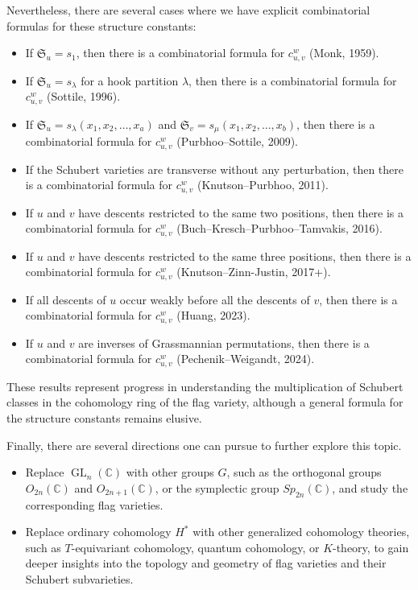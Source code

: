 Nevertheless, there are several cases where we have explicit combinatorial formulas for these structure constants:

\begin{itemize}
    \item If \(\mathfrak{S}_u = s_1\), then there is a combinatorial formula for \(c_{u,v}^w\) (Monk, 1959).
    \item If \(\mathfrak{S}_u = s_\lambda\) for a hook partition \(\lambda\), then there is a combinatorial formula for \(c_{u,v}^w\) (Sottile, 1996).
    \item If \(\mathfrak{S}_u = s_\lambda(x_1, x_2, \ldots, x_a)\) and \(\mathfrak{S}_v = s_\mu(x_1, x_2, \ldots, x_b)\), then there is a combinatorial formula for \(c_{u,v}^w\) (Purbhoo--Sottile, 2009).
    \item If the Schubert varieties are transverse without any perturbation, then there is a combinatorial formula for \(c_{u,v}^w\) (Knutson--Purbhoo, 2011).
    \item If \(u\) and \(v\) have descents restricted to the same two positions, then there is a combinatorial formula for \(c_{u,v}^w\) (Buch--Kresch--Purbhoo--Tamvakis, 2016).
    \item If \(u\) and \(v\) have descents restricted to the same three positions, then there is a combinatorial formula for \(c_{u,v}^w\) (Knutson--Zinn-Justin, 2017+).
    \item If all descents of \(u\) occur weakly before all the descents of \(v\), then there is a combinatorial formula for \(c_{u,v}^w\) (Huang, 2023).
    \item If \(u\) and \(v\) are inverses of Grassmannian permutations, then there is a combinatorial formula for \(c_{u,v}^w\) (Pechenik--Weigandt, 2024).
\end{itemize}

These results represent progress in understanding the multiplication of Schubert classes in the cohomology ring of the flag variety, although a general formula for the structure constants remains elusive.

Finally, there are several directions one can pursue to further explore this topic.
\begin{itemize}
    \item Replace \(\operatorname{GL}_n(\mathbb{C})\) with other groups \(G\), such as the orthogonal groups \(O_{2n}(\mathbb{C})\) and \(O_{2n+1}(\mathbb{C})\), or the symplectic group \(Sp_{2n}(\mathbb{C})\), and study the corresponding flag varieties.
    \item Replace ordinary cohomology \(H^*\) with other generalized cohomology theories, such as \(T\)-equivariant cohomology, quantum cohomology, or \(K\)-theory, to gain deeper insights into the topology and geometry of flag varieties and their Schubert subvarieties.
\end{itemize}